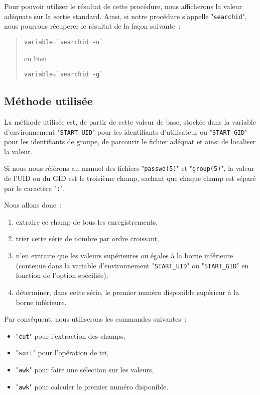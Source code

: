 Pour pouvoir utiliser le r{\'e}sultat de cette proc{\'e}dure, nous afficherons la
valeur ad{\'e}quate sur la sortie standard. Ainsi, si notre proc{\'e}dure
s'appelle "{\tt searchid}", nous pourrons r{\'e}cuperer le r{\'e}sultat
de la fa\c{c}on suivante~:
\begin{quote}
\begin{verbatim}
variable=`searchid -u`
\end{verbatim}
ou bien
\begin{verbatim}
variable=`searchid -g`
\end{verbatim}
\end{quote}

\subsection{\label{adv-programming-ex2-meth}M{\'e}thode utilis{\'e}e}

La m{\'e}thode utilis{\'e}e est, de partir de cette valeur de base, stock{\'e}e dans
la variable d'environnement "{\tt START\_UID}" pour les identifiants
d'utilisateur ou "{\tt START\_GID}" pour les identifiants de groupe,
de parcourir le fichier ad{\'e}quat et ainsi de localiser la valeur.

Si nous nous r{\'e}f{\'e}rons au manuel des fichiers "{\tt passwd(5)}" et
"{\tt group(5)}", la valeur de l'UID ou du GID est le troisi{\`e}me champ,
sachant que chaque champ est s{\'e}par{\'e} par le caract{\`e}re "{\tt :}".

Nous allons donc~:
\begin{enumerate}
	\item	extraire ce champ de tous les enregistrements,
	\item	trier cette s{\'e}rie de nombre par ordre croissant,
	\item	n'en extraire que les valeurs sup{\'e}rieures ou {\'e}gales {\`a} la borne
			inf{\'e}rieure (contenue dans la variable d'environnement
			"{\tt START\_UID}" ou "{\tt START\_GID}" en fonction
			de l'option sp{\'e}cifi{\'e}e),
	\item	d{\'e}terminer, dans cette s{\'e}rie, le premier num{\'e}ro disponible
			sup{\'e}rieur {\`a} la borne inf{\'e}rieure.
\end{enumerate}

Par cons{\'e}quent, nous utiliserons les commandes suivantes~:
\begin{itemize}
	\item	"{\tt cut}" pour l'extraction des champs,
	\item	"{\tt sort}" pour l'op{\'e}ration de tri,
	\item	"{\tt awk}" pour faire une s{\'e}lection sur les valeurs,
	\item	"{\tt awk}" pour calculer le premier num{\'e}ro disponible.
\end{itemize}

